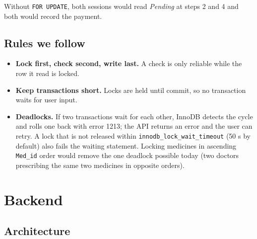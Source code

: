 \documentclass[11pt,a4paper]{article}
\newcommand{\code}[1]{\texttt{#1}}
\begin{document}
Without \code{FOR UPDATE}, both sessions would read \emph{Pending} at steps 2 and 4 and both would record the payment.

\subsection{Rules we follow}

\begin{itemize}
  \item \textbf{Lock first, check second, write last.} A check is only reliable while the row it read is locked.
  \item \textbf{Keep transactions short.} Locks are held until commit, so no transaction waits for user input.
  \item \textbf{Deadlocks.} If two transactions wait for each other, InnoDB detects the cycle and rolls one back with error 1213; the API returns an error and the user can retry. A lock that is not released within \code{innodb\_lock\_wait\_timeout} (50 s by default) also fails the waiting statement. Locking medicines in ascending \code{Med\_id} order would remove the one deadlock possible today (two doctors prescribing the same two medicines in opposite orders).
\end{itemize}

\section{Backend}

\subsection{Architecture}

\begin{center}
\end{center}
\end{document}
